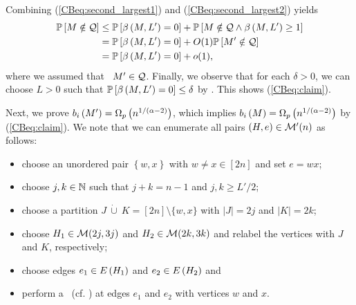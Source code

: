 Combining (\ref{CBeq:second_largest1}) and (\ref{CBeq:second_largest2}) yields
\begin{align*}
\mathbb{P}\left[M \notin \mathcal{Q}\right]&\leq \mathbb{P}\left[\beta\left(M, L'\right)=0\right]+\mathbb{P}\left[M \notin \mathcal{Q} \wedge \beta\left(M, L'\right)\geq 1\right]
\\
&= \mathbb{P}\left[\beta\left(M, L'\right)=0\right]+O(1)\mathbb{P}\left[M'\notin \mathcal{Q}\right]\\
&= \mathbb{P}\left[\beta\left(M, L'\right)=0\right]+o(1),
\end{align*}
where we assumed that \whp\ $M'\in \mathcal{Q}$. Finally, we observe that for each $\delta>0$, we can choose $L>0$ such that $\mathbb{P}\left[\beta\left(M, L'\right)=0\right]\leq \delta$ by . This shows (\ref{CBeq:claim}).

Next, we prove $b_{i}\left(M'\right)=\Omega_p\left(n^{1/\left(\alpha-2\right)}\right)$, which implies $b_{i}\left(M\right)=\Omega_p\left(n^{1/\left(\alpha-2\right)}\right)$ by (\ref{CBeq:claim}). We note that we can enumerate all pairs $(H, e)\in \mathcal{M}'(n)$ as follows:
\begin{itemize}
	\item choose an unordered pair $\left\{w,x\right\}$ with $w\neq x \in [2n]$ and set $e=wx$;
	\item choose $j,k \in \mathbb{N}$ such that $j+k=n-1$ and $j,k\geq L'/2$;
	\item choose a partition $J~\dot\cup~K=[2n]\setminus\{w, x\}$ with $|J|=2j$ and $|K|=2k$;
	\item choose $H_1\in \mathcal{M}(2j,3j)$ and $H_2\in \mathcal{M}(2k,3k)$ and relabel the vertices with $J$ and $K$, respectively;
	\item choose edges $e_1\in E\left(H_1\right)$ and $e_2\in E\left(H_2\right)$ and 
	\item[]
	perform a \bridgeInsertion\ (cf. ) at edges $e_1$ and $e_2$ with vertices $w$ and $x$.
\end{itemize}
